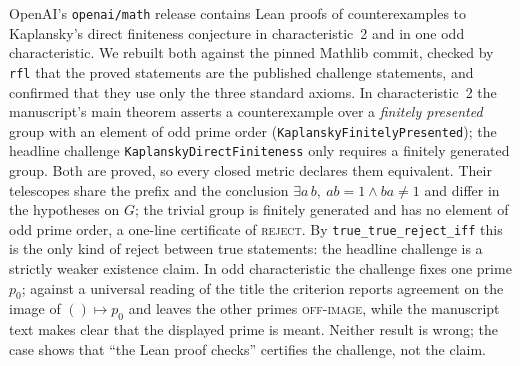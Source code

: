 \documentclass[10pt]{article}
\theoremstyle{definition}
\newcommand{\V}[1]{\textsc{#1}}
\begin{document}
OpenAI's \texttt{openai/math} release contains Lean proofs of counterexamples to Kaplansky's
direct finiteness conjecture in characteristic~2 and in one odd characteristic. We rebuilt both
against the pinned Mathlib commit, checked by \texttt{rfl} that the proved statements are the
published challenge statements, and confirmed that they use only the three standard axioms.
In characteristic~2 the manuscript's main theorem asserts a counterexample over a
\emph{finitely presented} group with an element of odd prime order
(\texttt{KaplanskyFinitelyPresented}); the headline challenge \texttt{KaplanskyDirectFiniteness}
only requires a finitely generated group. Both are proved, so every closed metric declares them
equivalent. Their telescopes share the prefix and the conclusion $\exists a\,b,\ ab=1\wedge
ba\ne1$ and differ in the hypotheses on $G$; the trivial group is finitely generated and has no
element of odd prime order, a one-line certificate of \V{reject}. By
\texttt{true\_true\_reject\_iff} this is the only kind of reject between true statements: the
headline challenge is a strictly weaker existence claim. In odd characteristic the challenge
fixes one prime $p_0$; against a universal reading of the title the criterion reports agreement
on the image of $()\mapsto p_0$ and leaves the other primes \V{off-image}, while the manuscript
text makes clear that the displayed prime is meant. Neither result is wrong; the case shows
that ``the Lean proof checks'' certifies the challenge, not the claim.
\end{document}

